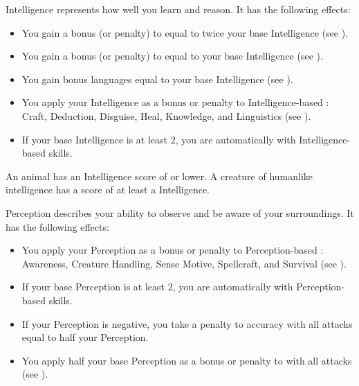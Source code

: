         \label{Intelligence}
        {
            Intelligence represents how well you learn and reason.
            It has the following effects:

            \begin{itemize}
                \item You gain a bonus (or penalty) to  equal to twice your base Intelligence (see ).
                \item You gain a bonus (or penalty) to  equal to your base Intelligence (see ).
                \item You gain bonus languages equal to your base Intelligence (see ).
                \item You apply your Intelligence as a bonus or penalty to Intelligence-based : Craft, Deduction, Disguise, Heal, Knowledge, and Linguistics (see ).
                \item If your base Intelligence is at least 2, you are automatically  with Intelligence-based skills.
            \end{itemize}

            \par An animal has an Intelligence score of  or lower.
            A creature of humanlike intelligence has a score of at least a  Intelligence.
        }

        \label{Perception}
        {
            Perception describes your ability to observe and be aware of your surroundings.
            It has the following effects:
            \begin{itemize}
                \item You apply your Perception as a bonus or penalty to Perception-based : Awareness, Creature Handling, Sense Motive, Spellcraft, and Survival (see ).
                \item If your base Perception is at least 2, you are automatically  with Perception-based skills.
                \item If your Perception is negative, you take a penalty to accuracy with all attacks equal to half your Perception.
                \item You apply half your base Perception as a bonus or penalty to  with all attacks (see ).
            \end{itemize}
        }

